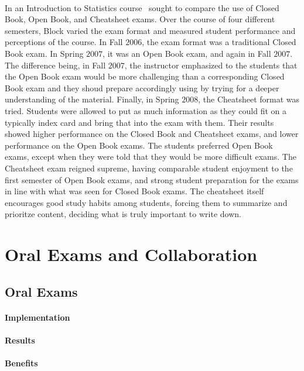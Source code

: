 \documentclass[12pt]{article}
\begin{document}
\paragraph{}
In an Introduction to Statistics course~\cite{block2012discussion} sought to compare the use of Closed Book, Open Book, and Cheatsheet exams. Over the course of four different semesters, Block varied the exam format and measured student performance and perceptions of the course. In Fall $2006$, the exam format was a traditional Closed Book exam. In Spring $2007$, it was an Open Book exam, and again in Fall $2007$. The difference being, in Fall $2007$, the instructor emphasized to the students that the Open Book exam would be more challenging than a corresponding Closed Book exam and they shoud prepare accordingly using by trying for a deeper understanding of the material. Finally, in Spring $2008$, the Cheatsheet format was tried. Students were allowed to put as much information as they could fit on a typically index card and bring that into the exam with them. Their results showed higher performance on the Closed Book and Cheatsheet exams, and lower performance on the Open Book exams. The students preferred Open Book exams, except when they were told that they would be more difficult exams. The Cheatsheet exam reigned supreme, having comparable student enjoyment to the first semester of Open Book exams, and strong student preparation for the exams in line with what was seen for Closed Book exams. The cheatsheet itself encourages good study habits among students, forcing them to summarize and prioritze content, deciding what is truly important to write down.

\section{Oral Exams and Collaboration}\label{sec:communication}
\subsection{Oral Exams}\label{subsec:oral}
\paragraph{Implementation}
\paragraph{Results}
\paragraph{Benefits}
\end{document}
